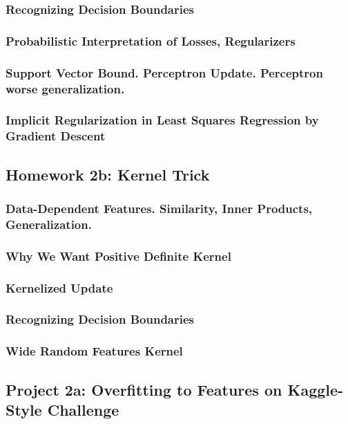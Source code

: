 \documentclass[12pt]{article}
\begin{document}
      \subsubsection*{Recognizing Decision Boundaries}
      \subsubsection*{Probabilistic Interpretation of Losses, Regularizers}
      \subsubsection*{Support Vector Bound.  Perceptron Update.  Perceptron worse generalization.}
      \subsubsection*{Implicit Regularization in Least Squares Regression by Gradient Descent}
    \newpage

    \subsection*{Homework 2b: Kernel Trick}
      \subsubsection*{Data-Dependent Features.  Similarity, Inner Products, Generalization.}
      \subsubsection*{Why We Want Positive Definite Kernel}
      \subsubsection*{Kernelized Update}
      \subsubsection*{Recognizing Decision Boundaries} %
      \subsubsection*{Wide Random Features Kernel}
    \newpage

    \subsection*{Project 2a: Overfitting to Features on Kaggle-Style Challenge} %
\end{document}
